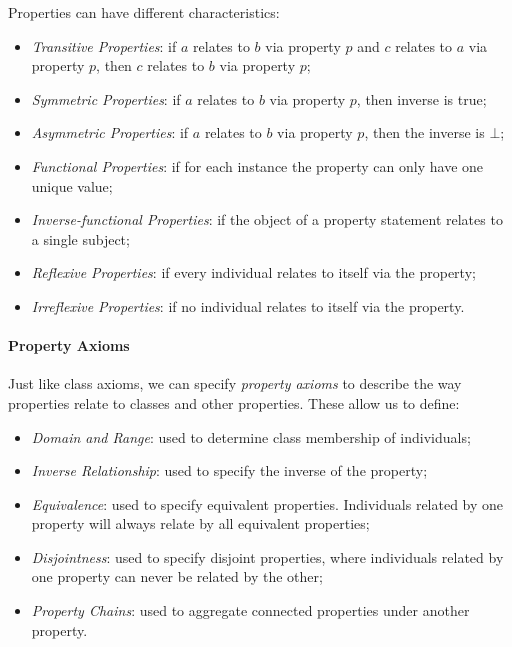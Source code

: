 Properties can have different characteristics:
\begin{itemize}
    \item \emph{Transitive Properties}: if $a$ relates to $b$ via property $p$ and $c$ relates to $a$ via property $p$, then $c$ relates to  $b$ via property $p$;
    \item \emph{Symmetric Properties}: if $a$ relates to $b$ via property $p$, then inverse is true;
    \item \emph{Asymmetric Properties}: if $a$ relates to $b$ via property $p$, then the inverse is $\bot$;
    \item \emph{Functional Properties}: if for each instance the property can only have one unique value;
    \item \emph{Inverse-functional Properties}: if the object of a property statement relates to a single subject;
    \item \emph{Reflexive Properties}: if every individual relates to itself via the property;
    \item \emph{Irreflexive Properties}: if no individual relates to itself via the property.
\end{itemize}

\paragraph{Property Axioms} Just like class axioms, we can specify \emph{property axioms} to describe the way properties relate to classes and other properties. These allow us to define:

\begin{itemize}
    \item \emph{Domain and Range}: used to determine class membership of individuals;
    \item \emph{Inverse Relationship}: used to specify the inverse of the property;
    \item \emph{Equivalence}: used to specify equivalent properties. Individuals related by one property will always relate by all equivalent properties;
    \item \emph{Disjointness}: used to specify disjoint properties, where individuals related by one property can never be related by the other;
    \item \emph{Property Chains}: used to aggregate connected properties under another property.
\end{itemize}
 

